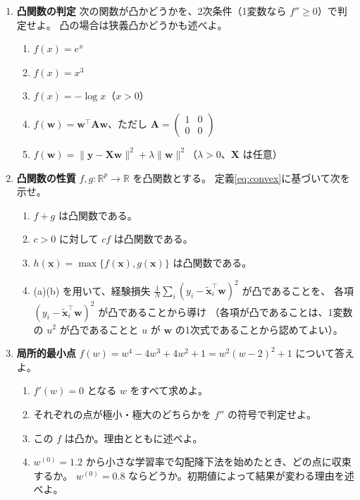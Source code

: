 \begin{enumerate}
  \item \textbf{凸関数の判定}\quad
    次の関数が凸かどうかを、2次条件（1変数なら $f'' \geq 0$）で判定せよ。
    凸の場合は狭義凸かどうかも述べよ。
    \begin{enumerate}
      \item $f(x) = e^x$
      \item $f(x) = x^3$
      \item $f(x) = -\log x$（$x > 0$）
      \item $f(\bm{w}) = \bm{w}^\top\bm{A}\bm{w}$、ただし $\bm{A} = \begin{pmatrix} 1 & 0 \\ 0 & 0 \end{pmatrix}$
      \item $f(\bm{w}) = \|\bm{y} - \bm{X}\bm{w}\|^2 + \lambda\|\bm{w}\|^2$（$\lambda > 0$、$\bm{X}$ は任意）
    \end{enumerate}

  \item \textbf{凸関数の性質}\quad
    $f, g : \mathbb{R}^p \to \mathbb{R}$ を凸関数とする。
    定義\eqref{eq:convex}に基づいて次を示せ。
    \begin{enumerate}
      \item $f + g$ は凸関数である。
      \item $c > 0$ に対して $cf$ は凸関数である。
      \item $h(\bm{x}) = \max\{f(\bm{x}), g(\bm{x})\}$ は凸関数である。
      \item (a)(b) を用いて、経験損失 $\frac{1}{N}\sum_i (y_i - \tilde{\bm{x}}_i^\top\bm{w})^2$ が凸であることを、
        各項 $(y_i - \tilde{\bm{x}}_i^\top\bm{w})^2$ が凸であることから導け
        （各項が凸であることは、1変数の $u^2$ が凸であることと $u$ が $\bm{w}$ の1次式であることから認めてよい）。
    \end{enumerate}

  \item \textbf{局所的最小点}\quad
    $f(w) = w^4 - 4w^3 + 4w^2 + 1 = w^2(w - 2)^2 + 1$ について答えよ。
    \begin{enumerate}
      \item $f'(w) = 0$ となる $w$ をすべて求めよ。
      \item それぞれの点が極小・極大のどちらかを $f''$ の符号で判定せよ。
      \item この $f$ は凸か。理由とともに述べよ。
      \item $w^{(0)} = 1.2$ から小さな学習率で勾配降下法を始めたとき、どの点に収束するか。
        $w^{(0)} = 0.8$ ならどうか。初期値によって結果が変わる理由を述べよ。
    \end{enumerate}


\end{enumerate}
